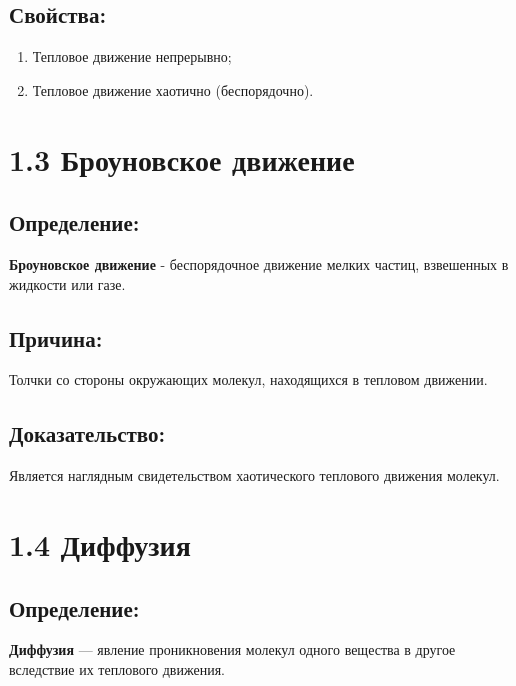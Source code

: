 \documentclass[a4paper,12pt]{article}
\begin{document}
\vspace{-9pt}
\subsection*{Свойства:}
\vspace{-3pt}
\begin{enumerate}[itemsep=0pt, topsep=0pt, parsep=0pt]
  \item Тепловое движение непрерывно;
  \item Тепловое движение хаотично (беспорядочно).
\end{enumerate}


\section*{1.3 Броуновское движение}

\vspace{-9pt}
\subsection*{Определение:}
\vspace{-3pt}
\textbf{Броуновское движение} - беспорядочное движение мелких частиц, взвешенных в жидкости или газе.

\vspace{-9pt}
\subsection*{Причина:}
\vspace{-3pt}
Толчки со стороны окружающих молекул, находящихся в тепловом движении.

\vspace{-9pt}
\subsection*{Доказательство:}
\vspace{-3pt}
Является наглядным свидетельством хаотического теплового движения молекул.


\newpage


\section*{1.4 Диффузия}

\vspace{-9pt}
\subsection*{Определение:}
\vspace{-3pt}
\textbf{Диффузия} --- явление проникновения молекул одного вещества в другое вследствие их теплового движения.
\end{document}
